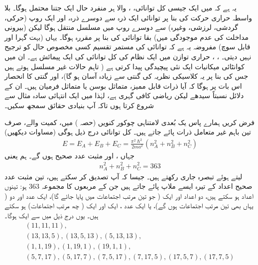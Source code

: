  یہ ہے کہ  میں ایک جیسی کل توانائی، ، والا ہر منفرد حال ایک جتنا محتمل ہوگا۔ بلا واسطہ حراری حرکت کی بنا پر توانائی ایک ذرہ سے دوسرے ذرہ، اور ایک روپ (حرکی، گردشی، لرزشی، وغیرہ) سے دوسرے روپ میں مسلسل منتقل ہوگا لیکن (بیرونی مداخلت کی عدم موجودگی میں) بقا توانائی کی بنا پر  مقررہ ہوگا۔ یہاں (بہت گہرا اور قابل سوچ) مفروضہ یہ ہے کہ توانائی کی مستمر تقسیم کسی مخصوص حال کو ترجیح نہیں دیتی۔ ، ، حراری توازن میں ایک نظام کی کل توانائی کی ایک پیمائش ہے۔ ان  میں کوانٹائی میکانیات ایک نئی پیچیدگی پیدا کرتی ہے ( تاہم حالات غیر مسلسل ہوتے ہیں جس کی بنا پر یہ کلاسیکی نظریہ کی گنتی سے زیادہ آسان ہو گا)، اور گنتی کا انحصار اس بات پر ہوگا کہ آیا ذرات قابل ممیز، متماثل بوسن یا متماثل فرمیان ہیں۔ ان کے دلائل نسبتاً سیدھے لیکن ریاضی کافی گہری ہے، لہٰذا میں ایک انتہائی سادہ مثال سے شروع کرتا ہوں تاکہ آپ بنیادی حقائق سمجھ سکیں۔

 
فرض کریں ہمارے پاس یک بُعدی لامتناہی چوکور کنویں (حصہ ) میں، کمیت  والے، صرف تین باہم غیر متعامل ذرات پائے جاتے ہیں۔ کل توانائی درج ذیل ہوگی (مساوات  دیکھیں)
\begin{align}
	E = E_A + E_B + E_C = \frac{\pi^2 \hslash ^2}{2ma^2}(n^2_A + n^2_B + n^2_C)
\end{align}
جہاں ،  اور  مثبت عدد صحیح ہوں گے۔ ہم  یعنی
\begin{align}
	n^2_A + n^2_B + n^2_C = 363
\end{align} 
لیتے ہوئے تبصرہ جاری رکھتے ہیں۔ جیسا کہ آپ تصدیق کر سکتے ہیں، تین مثبت عدد صحیح اعداد کے تیرہ ایسے ملاپ پائے جاتے ہیں جن کے مربعوں کا مجموعہ \num{363} ہو: تینوں اعداد  ہو سکتے ہیں، دو اعداد  اور ایک  ( جو تین مرتب اجتماعات میں پایا جائے گا)، ایک عدد اور دو  ( یہاں بھی تین مرتب اجتماعات ہوں گے)، یا ایک عدد ، ایک  اور ایک  ( چھ مرتب اجتماعات) ہو سکتے ہیں۔ یوں  درج ذیل میں سے ایک ہوگا۔
\begin{gather*}
	(11, 11, 11),\\
	(13, 13, 5), (13, 5, 13), (5, 13, 13),\\
	(1, 1, 19), (1, 19, 1), (19, 1, 1),\\
	(5, 7, 17), (5, 17, 7), (7, 5, 17), (7, 17, 5), (17, 5, 7), (17, 7, 5)
\end{gather*}

